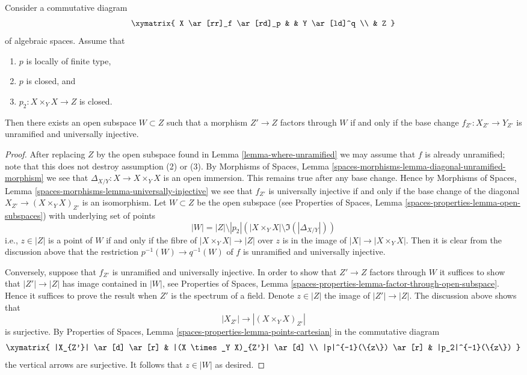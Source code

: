 \begin{lemma}
\label{lemma-where-unramified-universally-injective}
Consider a commutative diagram
$$
\xymatrix{
X \ar[rr]_f \ar[rd]_p & & Y \ar[ld]^q \\
& Z
}
$$
of algebraic spaces. Assume that
\begin{enumerate}
\item $p$ is locally of finite type,
\item $p$ is closed, and
\item $p_2 : X \times_Y X \to Z$ is closed.
\end{enumerate}
Then there exists an open subspace $W \subset Z$
such that a morphism $Z' \to Z$ factors through $W$ if and only if the
base change $f_{Z'} : X_{Z'} \to Y_{Z'}$ is unramified and universally
injective.
\end{lemma}

\begin{proof}
After replacing $Z$ by the open subspace found in
Lemma \ref{lemma-where-unramified}
we may assume that $f$ is already unramified; note that this does not
destroy assumption (2) or (3). By
Morphisms of Spaces, Lemma
\ref{spaces-morphisms-lemma-diagonal-unramified-morphism}
we see that $\Delta_{X/Y} : X \to X \times_Y X$ is an open immersion.
This remains true after any base change. Hence by
Morphisms of Spaces, Lemma
\ref{spaces-morphisms-lemma-universally-injective}
we see that $f_{Z'}$ is universally injective if and only if
the base change of the diagonal $X_{Z'} \to (X \times_Y X)_{Z'}$
is an isomorphism. Let $W \subset Z$ be the open subspace
(see
Properties of Spaces, Lemma
\ref{spaces-properties-lemma-open-subspaces})
with underlying set of points
$$
|W| = |Z| \setminus
|p_2|\left(|X \times_Y X| \setminus \Im(|\Delta_{X/Y}|)\right)
$$
i.e., $z \in |Z|$ is a point of $W$ if and only if the fibre of
$|X \times_Y X| \to |Z|$ over $z$ is in the image of
$|X| \to |X \times_Y X|$. Then it is clear from the discussion above
that the restriction $p^{-1}(W) \to q^{-1}(W)$ of $f$ is
unramified and universally injective.

\medskip\noindent
Conversely, suppose that $f_{Z'}$ is unramified and universally injective.
In order to show that $Z' \to Z$ factors through $W$ it suffices to show
that $|Z'| \to |Z|$ has image contained in $|W|$, see
Properties of Spaces, Lemma
\ref{spaces-properties-lemma-factor-through-open-subspace}.
Hence it suffices to prove the result when $Z'$ is the spectrum of a field.
Denote $z \in |Z|$ the image of $|Z'| \to |Z|$. The discussion above shows
that
$$
|X_{Z'}| \longrightarrow |(X \times_Y X)_{Z'}|
$$
is surjective. By
Properties of Spaces,
Lemma \ref{spaces-properties-lemma-points-cartesian}
in the commutative diagram
$$
\xymatrix{
|X_{Z'}| \ar[d] \ar[r] &
|(X \times_Y X)_{Z'}| \ar[d] \\
|p|^{-1}(\{z\}) \ar[r] &
|p_2|^{-1}(\{z\})
}
$$
the vertical arrows are surjective. It follows that $z \in |W|$ as desired.
\end{proof}

